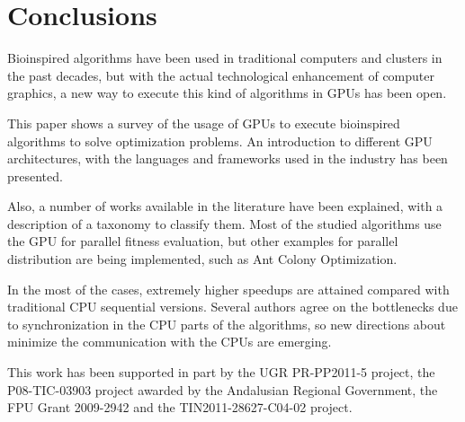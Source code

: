\documentclass[prodmode,acmtecs]{acmsmall}
\begin{document}
\section{Conclusions}
\label{sec:conclusions}

Bioinspired algorithms have been used in traditional computers and clusters in 
the past decades, but with the actual technological enhancement of computer graphics, a new way to execute this kind of algorithms in GPUs has been open. 

This paper shows a survey of the usage of GPUs to execute bioinspired
algorithms to solve optimization problems. An introduction to different GPU architectures, with the languages and frameworks used in the industry has been presented.

Also, a number of works available in the literature have been explained, with a description of a taxonomy to classify them. Most of the studied algorithms use the GPU for parallel fitness evaluation, but other examples for parallel distribution are being implemented, such as Ant Colony Optimization.

In the most of the cases, extremely higher speedups are attained compared with traditional CPU sequential versions. Several authors agree on the bottlenecks due to synchronization in the CPU parts of the algorithms, so new directions 
about minimize the communication with the CPUs are emerging.


\begin{acks}
This work has been supported in part by 
the UGR PR-PP2011-5 project, 
the P08-TIC-03903 project awarded by the Andalusian Regional Government, 
the FPU Grant 2009-2942 
and 
the TIN2011-28627-C04-02 project.

\end{acks}


 


\bigskip


\end{document}
